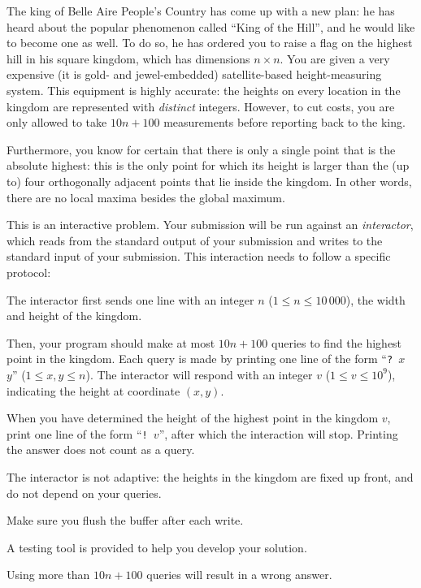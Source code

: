

\newcommand{\maxn}{10\,000}
\newcommand{\maxq}{10n+100}
\newcommand{\maxv}{10^9}

The king of Belle Aire People's Country has come up with a new plan:
he has heard about the popular phenomenon called ``King of the Hill'',
and he would like to become one as well.
To do so, he has ordered you to raise a flag on the highest hill in his square kingdom,
which has dimensions $n \times n$.
You are given a very expensive (it is gold- and jewel-embedded) satellite-based height-measuring system.
This equipment is highly accurate:
the heights on every location in the kingdom are represented with \emph{distinct} integers.
However, to cut costs, you are only allowed to take $\maxq$ measurements
before reporting back to the king.

Furthermore, you know for certain that there is only a single point that is the absolute highest:
this is the only point for which its height is larger
than the (up to) four orthogonally adjacent points that lie inside the kingdom.
In other words, there are no local maxima besides the global maximum.

\begin{Interaction}
    This is an interactive problem.
    Your submission will be run against an \emph{interactor},
    which reads from the standard output of your submission
    and writes to the standard input of your submission.
    This interaction needs to follow a specific protocol:

    The interactor first sends
    one line with an integer $n$ ($1\leq n\leq \maxn$),
    the width and height of the kingdom.

    Then, your program should make at most $\maxq$ queries to find the highest point in the kingdom.
    Each query is made by printing one line of the form ``\texttt{?~$x$~$y$}'' ($1\leq x,y\leq n$).
    The interactor will respond with an integer $v$ ($1 \leq v \leq \maxv$),
    indicating the height at coordinate $(x, y)$.

    When you have determined the height of the highest point in the kingdom $v$,
    print one line of the form ``\texttt{!~$v$}'',
    after which the interaction will stop.
    Printing the answer does not count as a query.

    The interactor is not adaptive: the heights in the kingdom are fixed up front, and do not depend on your queries.

    Make sure you flush the buffer after each write.

    A testing tool is provided to help you develop your solution.

    Using more than $\maxq$ queries will result in a wrong answer.
\end{Interaction}
